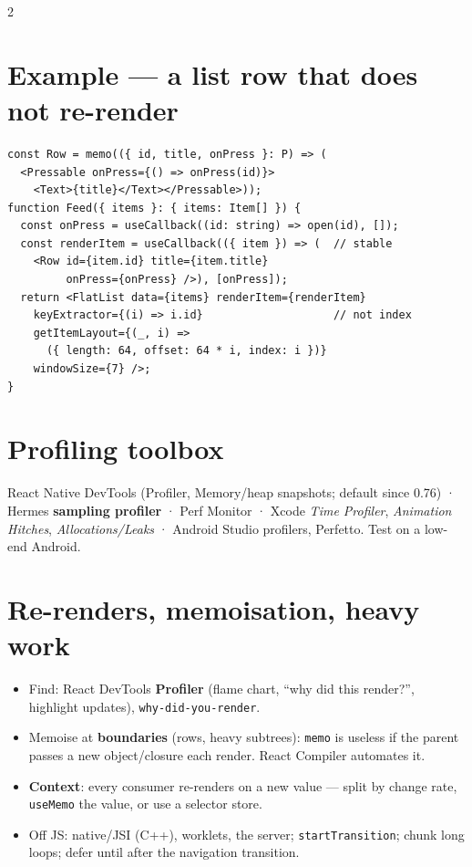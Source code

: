 \documentclass[8pt]{extarticle}
\begin{document}
\begin{multicols}{2}
\section{Example — a list row that does not re-render}
\begin{lstlisting}[language=TSSheet]
const Row = memo(({ id, title, onPress }: P) => (
  <Pressable onPress={() => onPress(id)}>
    <Text>{title}</Text></Pressable>));
function Feed({ items }: { items: Item[] }) {
  const onPress = useCallback((id: string) => open(id), []);
  const renderItem = useCallback(({ item }) => (  // stable
    <Row id={item.id} title={item.title}
         onPress={onPress} />), [onPress]);
  return <FlatList data={items} renderItem={renderItem}
    keyExtractor={(i) => i.id}                    // not index
    getItemLayout={(_, i) =>
      ({ length: 64, offset: 64 * i, index: i })}
    windowSize={7} />;
}
\end{lstlisting}

\section{Profiling toolbox}
React Native DevTools (Profiler, Memory/heap snapshots; default since 0.76) · Hermes
\textbf{sampling profiler} · Perf Monitor · Xcode \emph{Time Profiler},
\emph{Animation Hitches}, \emph{Allocations/Leaks} · Android Studio profilers, Perfetto.
Test on a low-end Android.

\columnbreak

\section{Re-renders, memoisation, heavy work}
\begin{itemize}
  \item Find: React DevTools \textbf{Profiler} (flame chart, ``why did this render?'',
        highlight updates), \texttt{why-did-you-render}.
  \item Memoise at \textbf{boundaries} (rows, heavy subtrees): \texttt{memo} is useless
        if the parent passes a new object/closure each render. React Compiler automates it.
  \item \textbf{Context}: every consumer re-renders on a new value — split by change
        rate, \texttt{useMemo} the value, or use a selector store.
  \item Off JS: native/JSI (C++), worklets, the server; \texttt{startTransition};
        chunk long loops; defer until after the navigation transition.
\end{itemize}


\end{multicols}
\end{document}
